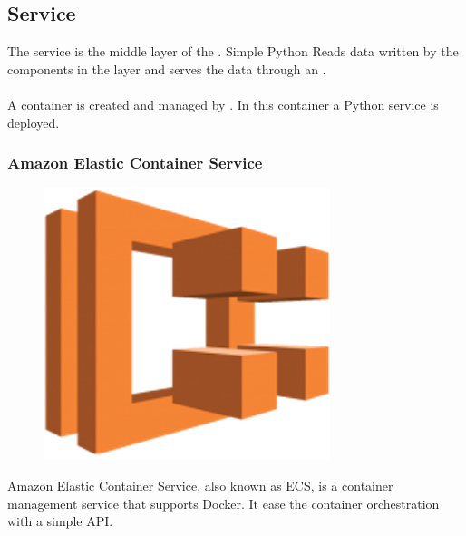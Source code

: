 
\subsection{Service} \label{service}

The service is the middle layer of the \thesis. Simple Python\cite{python} Reads data written by the components in the  layer and serves the data through an .
\\\\
A  container is created and managed by . In this container a Python\cite{python} service is deployed.


\subsubsection*{Amazon Elastic Container Service} \label{ecs}

\begin{figure}[H]
\includegraphics[scale=0.1]{resources/ecs-logo.png}
\end{figure}

Amazon Elastic Container Service, also known as ECS\cite{ecs}, is a container management service that supports Docker. It ease the container orchestration with a simple API.

